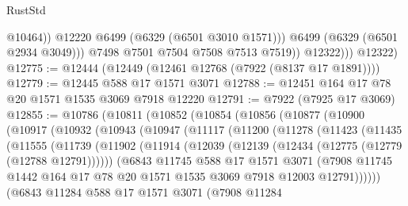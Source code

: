 \begin{lexlean}{RustStd}
\begin{coremodule}
{\begin{coremodule}
{{{{{{{{{{{{{{{{{{{{{{{{{{{{{{{{{{{                        @10464))
                    @12220
                    @6499
                    (@6329 (@6501 @3010 @1571)))
                  @6499
                  (@6329 (@6501 @2934 @3049)))
                @7498
                @7501
                @7504
                @7508
                @7513
                @7519))
            @12322)))
      @12322)
@12775 := @12444 (@12449 (@12461 @12768 (@7922 (@8137 @17 @1891))))
@12779 := @12445 @588 @17 @1571 @3071
@12788 := @12451 @164 @17 @78 @20 @1571 @1535 @3069 @7918 @12220
@12791 := @7922 (@7925 @17 @3069)
@12855 := @10786
    (@10811
      (@10852
        (@10854
          (@10856
            (@10877
              (@10900
                (@10917
                  (@10932
                    (@10943
                      (@10947
                        (@11117
                          (@11200
                            (@11278
                              (@11423
                                (@11435
                                  (@11555
                                    (@11739
                                      (@11902
                                        (@11914
                                          (@12039
                                            (@12139 (@12434 (@12775 (@12779 (@12788 @12791))))))
                                          (@6843
                                            @11745
                                            @588
                                            @17
                                            @1571
                                            @3071
                                            (@7908
                                              @11745
                                              @1442
                                              @164
                                              @17
                                              @78
                                              @20
                                              @1571
                                              @1535
                                              @3069
                                              @7918
                                              @12003
                                              @12791))))))
                                  (@6843
                                    @11284
                                    @588
                                    @17
                                    @1571
                                    @3071
                                    (@7908
                                      @11284
}}}}}}}}}}}}}}}}}}}}}}}}}}}}}}}}}}}
\end{coremodule}}
\end{coremodule}
\end{lexlean}

